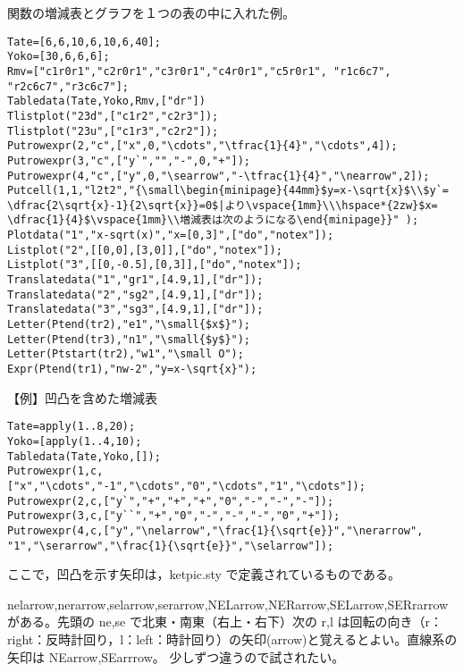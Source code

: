 \documentclass[papersize,a4paper,10pt,uplatex]{jsarticle}
\begin{document}
\begin{description}
関数の増減表とグラフを１つの表の中に入れた例。
\begin{verbatim}
Tate=[6,6,10,6,10,6,40];
Yoko=[30,6,6,6];
Rmv=["c1r0r1","c2r0r1","c3r0r1","c4r0r1","c5r0r1", "r1c6c7",
"r2c6c7","r3c6c7"]; 
Tabledata(Tate,Yoko,Rmv,["dr"])
Tlistplot("23d",["c1r2","c2r3"]);
Tlistplot("23u",["c1r3","c2r2"]);
Putrowexpr(2,"c",["x",0,"\cdots","\tfrac{1}{4}","\cdots",4]);
Putrowexpr(3,"c",["y`","","-",0,"+"]);
Putrowexpr(4,"c",["y",0,"\searrow","-\tfrac{1}{4}","\nearrow",2]);
Putcell(1,1,"l2t2","{\small\begin{minipage}{44mm}$y=x-\sqrt{x}$\\$y`=
\dfrac{2\sqrt{x}-1}{2\sqrt{x}}=0$|より\vspace{1mm}\\\hspace*{2zw}$x=
\dfrac{1}{4}$\vspace{1mm}\\増減表は次のようになる\end{minipage}}" );
Plotdata("1","x-sqrt(x)","x=[0,3]",["do","notex"]);
Listplot("2",[[0,0],[3,0]],["do","notex"]);
Listplot("3",[[0,-0.5],[0,3]],["do","notex"]);
Translatedata("1","gr1",[4.9,1],["dr"]);
Translatedata("2","sg2",[4.9,1],["dr"]);
Translatedata("3","sg3",[4.9,1],["dr"]);
Letter(Ptend(tr2),"e1","\small{$x$}");
Letter(Ptend(tr3),"n1","\small{$y$}");
Letter(Ptstart(tr2),"w1","\small O");
Expr(Ptend(tr1),"nw-2","y=x-\sqrt{x}");
\end{verbatim}
\begin{center}  \end{center}

\vspace{\baselineskip}
【例】凹凸を含めた増減表
\begin{verbatim}
Tate=apply(1..8,20);
Yoko=[apply(1..4,10);
Tabledata(Tate,Yoko,[]);
Putrowexpr(1,c,["x","\cdots","-1","\cdots","0","\cdots","1","\cdots"]);
Putrowexpr(2,c,["y`","+","+","+","0","-","-","-"]);
Putrowexpr(3,c,["y``","+","0","-","-","-","0","+"]);
Putrowexpr(4,c,["y","\nelarrow","\frac{1}{\sqrt{e}}","\nerarrow",
"1","\serarrow","\frac{1}{\sqrt{e}}","\selarrow"]);
\end{verbatim}
\begin{center}  \end{center}
ここで，凹凸を示す矢印は，ketpic.sty で定義されているものである。

nelarrow,nerarrow,selarrow,serarrow,NELarrow,NERarrow,SELarrow,SERrarrow がある。先頭の ne,se で北東・南東（右上・右下）次の r,l は回転の向き（r：right：反時計回り，l：left：時計回り）の矢印(arrow)と覚えるとよい。直線系の矢印は NEarrow,SEarrrow。 少しずつ違うので試されたい。


\end{description}
\end{document}
